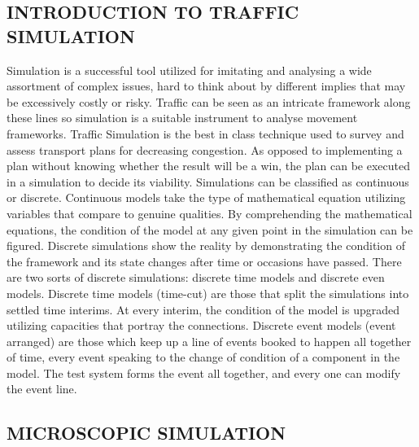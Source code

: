 \documentclass[11pt,a4paper]{article}
\begin{document}
\subsection{INTRODUCTION TO TRAFFIC SIMULATION}

Simulation is a successful tool utilized for imitating and analysing a wide assortment of complex issues, hard to think about by different implies that may be excessively costly or risky. Traffic can be seen as an intricate framework along these lines so simulation is a suitable instrument to analyse movement frameworks. Traffic Simulation is the best in class technique used to survey and assess transport plans for decreasing congestion. As opposed to implementing a plan without knowing whether the result will be a win, the plan can be executed in a simulation to decide its viability.\newline
Simulations can be classified as continuous or discrete. Continuous models take the type of mathematical equation utilizing variables that compare to genuine qualities. By comprehending the mathematical equations, the condition of the model at any given point in the simulation can be figured. Discrete simulations show the reality by demonstrating the condition of the framework and its state changes after time or occasions have passed. There are two sorts of discrete simulations: discrete time models and discrete even models. Discrete time models (time-cut) are those that split the simulations into settled time interims. At every interim, the condition of the model is upgraded utilizing capacities that portray the connections. Discrete event models (event arranged) are those which keep up a line of events booked to happen all together of time, every event speaking to the change of condition of a component in the model. The test system forms the event all together, and every one can modify the event line.


\subsection{MICROSCOPIC SIMULATION}
\end{document}
